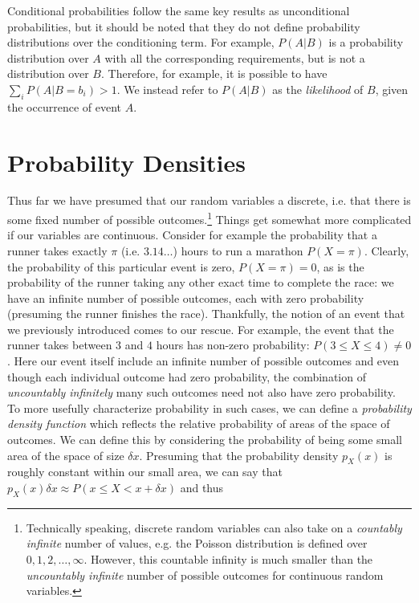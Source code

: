 Conditional probabilities follow  the same key results as unconditional probabilities, but it 
should be noted that they do not define probability distributions over the conditioning term.  
For example, $P(A|B)$ is a probability distribution over $A$ with all the corresponding 
requirements, but is not a distribution over $B$.  Therefore,
for example, it is possible to have $\sum_{i} P(A|B=b_i) >1$.  We instead refer to $P(A|B)$
as the \emph{likelihood} of $B$, given the occurrence of event $A$.

\section{Probability Densities}
\label{sec:prob:den}

Thus far we have presumed that our random variables a discrete, i.e. that there is some fixed
number of possible outcomes.\footnote{Technically speaking, discrete random variables can also
	take on a \emph{countably infinite} number of values, e.g. the Poisson distribution is defined
	over $0,1,2,\dots,\infty$.  
	However, this countable infinity is much smaller than the \emph{uncountably infinite} number
	of possible outcomes for continuous random variables.}
Things get somewhat more complicated if our variables are continuous.  Consider for example
the probability that a runner takes exactly $\pi$ (i.e. $3.14\dots$) hours to run a marathon $P(X=\pi)$.  
Clearly, the probability
of this particular event is zero, $P(X=\pi)=0$, as is the probability of the runner taking any other exact time
to complete the race: we have an infinite number of possible outcomes, each with zero probability
(presuming the runner finishes the race).  Thankfully, the notion of an event that we previously
introduced comes to our rescue.  For example, the event that the runner takes between $3$ and
$4$ hours has non-zero probability: $P(3\le X \le 4) \neq 0$.  Here our event itself include
an infinite number of possible outcomes and even though each individual outcome had
zero probability, the combination of \emph{uncountably infinitely} many such outcomes need
not also have zero probability.  To more usefully characterize probability in such cases, we can
define a \emph{probability density function} which reflects the relative probability of areas of
the space of outcomes.  We can define this by considering the probability
of being some small area of the space of size $\delta x$.  Presuming that the probability density
$p_{X}(x)$ is roughly constant within our small area, we can say that 
$p_{X}(x)\delta x \approx P(x\le X <x+\delta x)$ and thus 
